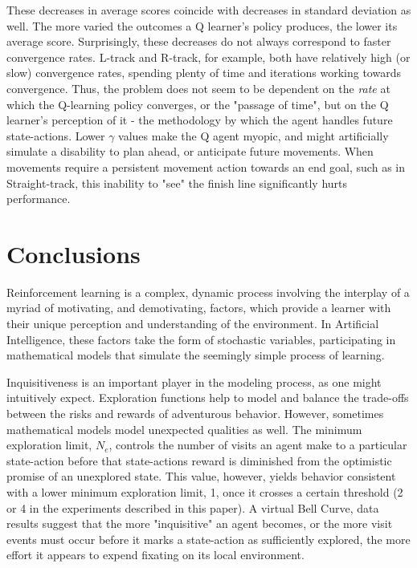 \documentclass[12pt, letter]{article}
\begin{document}
These decreases in average scores coincide with decreases in standard deviation as well.  The more varied the outcomes a Q learner's policy produces, the lower its average score.  Surprisingly, these decreases do not always correspond to faster convergence rates.  L-track and R-track, for example, both have relatively high (or slow) convergence rates, spending plenty of time and iterations working towards convergence.  Thus, the problem does not seem to be dependent on the \emph{rate} at which the Q-learning policy converges, or the "passage of time", but on the Q learner's perception of it - the methodology by which the agent handles future state-actions.  Lower $\gamma$ values make the Q agent myopic, and might artificially simulate a disability to plan ahead, or anticipate future movements.  When movements require a persistent movement action towards an end goal, such as in Straight-track, this inability to "see" the finish line significantly hurts performance.

\section{Conclusions}
    Reinforcement learning is a complex, dynamic process involving the interplay of a myriad of motivating, and demotivating, factors, which provide a learner with their unique perception and understanding of the environment.  In Artificial Intelligence, these factors take the form of stochastic variables, participating in mathematical models that simulate the seemingly simple process of learning.

    Inquisitiveness is an important player in the modeling process, as one might intuitively expect.  Exploration functions help to model and balance the trade-offs between the risks and rewards of adventurous behavior.  However, sometimes mathematical models model unexpected qualities as well.  The minimum exploration limit, $N_e$, controls the number of visits an agent make to a particular state-action before that state-actions reward is diminished from the optimistic promise of an unexplored state.  This value, however, yields behavior consistent with a lower minimum exploration limit, 1, once it crosses a certain threshold (2 or 4 in the experiments described in this paper).  A virtual Bell Curve, data results suggest that the more "inquisitive" an agent becomes, or the more visit events must occur before it marks a state-action as sufficiently explored, the more effort it appears to expend fixating on its local environment.
    
\end{document}
